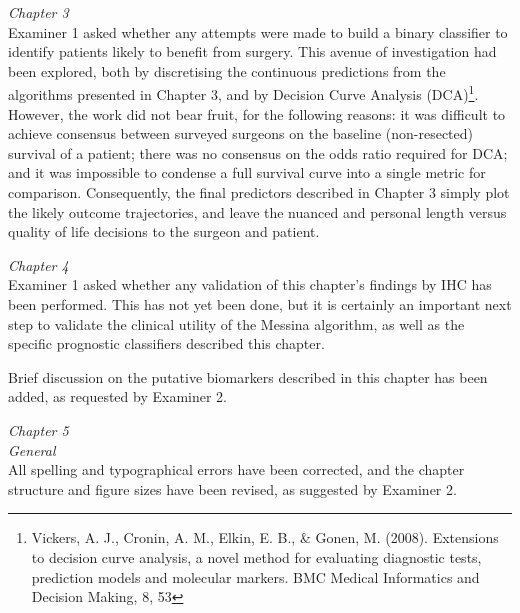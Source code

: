 \documentclass[a4paper,12pt,stdletter,sigleft]{newlfm}
\begin{document}
\begin{newlfm}
\emph{Chapter 3} \\
Examiner 1 asked whether any attempts were made to build a binary classifier to identify patients likely to benefit from surgery.  This avenue of investigation had been explored, both by discretising the continuous predictions from the algorithms presented in Chapter 3, and by Decision Curve Analysis (DCA)\footnote{Vickers, A. J., Cronin, A. M., Elkin, E. B., \& Gonen, M. (2008). Extensions to decision curve analysis, a novel method for evaluating diagnostic tests, prediction models and molecular markers. BMC Medical Informatics and Decision Making, 8, 53}.  However, the work did not bear fruit, for the following reasons: it was difficult to achieve consensus between surveyed surgeons on the baseline (non-resected) survival of a patient; there was no consensus on the odds ratio required for DCA; and it was impossible to condense a full survival curve into a single metric for comparison.  Consequently, the final predictors described in Chapter 3 simply plot the likely outcome trajectories, and leave the nuanced and personal length versus quality of life decisions to the surgeon and patient.

\emph{Chapter 4} \\
Examiner 1 asked whether any validation of this chapter's findings by IHC has been performed.  This has not yet been done, but it is certainly an important next step to validate the clinical utility of the Messina algorithm, as well as the specific prognostic classifiers described this chapter.

Brief discussion on the putative biomarkers described in this chapter has been added, as requested by Examiner 2.

\emph{Chapter 5} \\

\emph{General} \\
All spelling and typographical errors have been corrected, and the chapter structure and figure sizes have been revised, as suggested by Examiner 2.


\end{newlfm}
\end{document}
